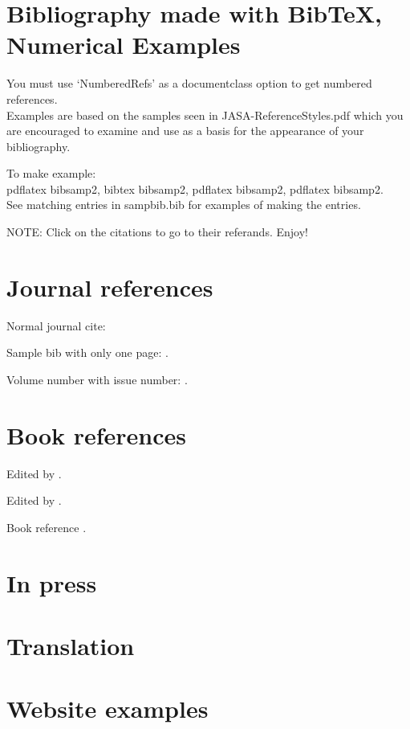 \documentclass[preprint, NumberedRefs]{JASAnew}
\begin{document}
\section*{Bibliography made with BibTeX, Numerical Examples}

You must use `NumberedRefs' as a documentclass option to get
numbered references.\\
Examples are based on the samples seen in JASA-ReferenceStyles.pdf which you
are encouraged to examine and use as a basis for the appearance of your bibliography.

To make example:\\
 pdflatex bibsamp2, bibtex bibsamp2, pdflatex bibsamp2, pdflatex
 bibsamp2.\\
 See matching entries in sampbib.bib for examples of making the entries.

NOTE: Click on the citations to go to their referands. Enjoy!

\section*{Journal references}

 Normal journal cite: \cite{joursamp1}

 Sample bib with only one page: \cite{joursamp2}.

 Volume number with issue number: \cite{yang}.


\section*{Book references}

Edited by \cite{sampincollection3}.

Edited by \cite{sampincollection4}.

Book reference \cite{booksamp1}.


\section*{In press}

\cite{inpress1,inpress2}

\cite{samponline}

\section*{Translation}

\cite{translation}

\section*{Website examples}
\end{document}
